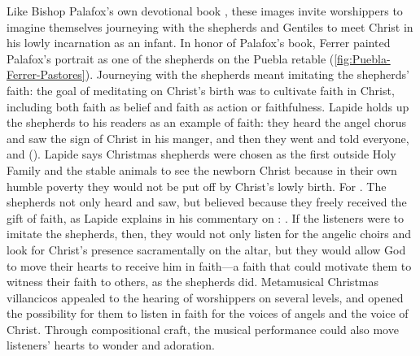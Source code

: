 Like Bishop Palafox's own devotional book ,
these images invite worshippers to imagine themselves journeying with the
shepherds and Gentiles to meet Christ in his lowly incarnation as an infant.%
    \Autocite{Palafox:Nochebuena}
In honor of Palafox's book, Ferrer painted Palafox's portrait as one of the
shepherds on the Puebla retable (\cref{fig:Puebla-Ferrer-Pastores}).%
    \Autocite[188--189]{Merlo:PueblaCat}
Journeying with the shepherds meant imitating the shepherds' faith: the goal of
meditating on Christ's birth was to cultivate faith in Christ, including both
faith as belief and faith as action or faithfulness.
Lapide holds up the shepherds to his readers as an example of faith: they heard
the angel chorus and saw the sign of Christ in his manger, and then they went
and told everyone, and  ().
Lapide says Christmas shepherds were chosen as the first outside Holy Family and
the stable animals to see the newborn Christ because in their own humble poverty
they would not be put off by Christ's lowly birth.
For .%
    \Autocite[677, on ]{Lapide:Gospels19C}
The shepherds not only heard and saw, but believed because they freely received
the gift of faith, as Lapide explains in his commentary on
: .%
    \Autocite
    [882; Lapide seems to have a polemical eye here on his Calvinist compatriots
    in the Low Countries.]
    {Lapide:Gospels19C}
If the listeners were to imitate the shepherds, then, they would not only listen
for the angelic choirs and look for Christ's presence sacramentally on the
altar, but they would allow God to move their hearts to receive him in faith---a
faith that could motivate them to witness their faith to others, as the
shepherds did.
Metamusical Christmas villancicos appealed to the hearing of worshippers on
several levels, and opened the possibility for them to listen in faith for the
voices of angels and the voice of Christ.
Through compositional craft, the musical performance could also move listeners'
hearts to wonder and adoration.

